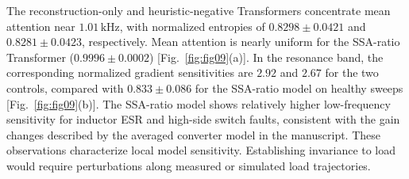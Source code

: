 \documentclass[journal,onecolumn]{IEEEtran}
\begin{document}
The reconstruction-only and heuristic-negative Transformers concentrate mean attention near $1.01\,\mathrm{kHz}$, with normalized entropies of $0.8298\pm0.0421$ and $0.8281\pm0.0423$, respectively. Mean attention is nearly uniform for the SSA-ratio Transformer ($0.9996\pm0.0002$) [Fig.~\ref{fig:fig09}(a)]. In the resonance band, the corresponding normalized gradient sensitivities are $2.92$ and $2.67$ for the two controls, compared with $0.833\pm0.086$ for the SSA-ratio model on healthy sweeps [Fig.~\ref{fig:fig09}(b)]. The SSA-ratio model shows relatively higher low-frequency sensitivity for inductor ESR and high-side switch faults, consistent with the gain changes described by the averaged converter model in the manuscript. These observations characterize local model sensitivity. Establishing invariance to load would require perturbations along measured or simulated load trajectories.
\end{document}
